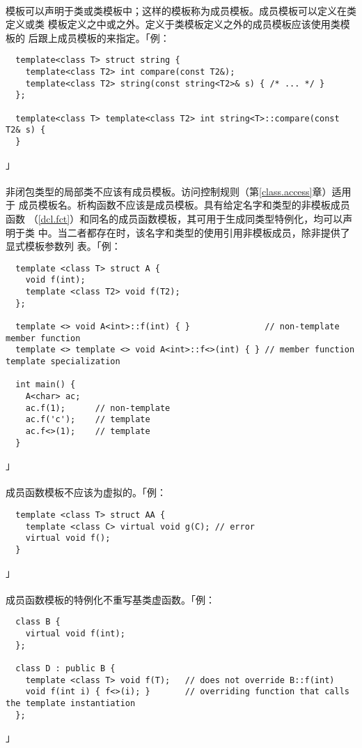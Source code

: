 \paragraph{}
模板可以声明于类或类模板中；这样的模板称为成员模板。成员模板可以定义在类定义或类
模板定义之中或之外。定义于类模板定义之外的成员模板应该使用类模板的
后跟上成员模板的来指定。「例：
\begin{lstlisting}
  template<class T> struct string {
    template<class T2> int compare(const T2&);
    template<class T2> string(const string<T2>& s) { /* ... */ }
  };

  template<class T> template<class T2> int string<T>::compare(const T2& s) {
  }
\end{lstlisting}」

\paragraph{}
非闭包类型的局部类不应该有成员模板。访问控制规则（第\ref{class.access}章）适用于
成员模板名。析构函数不应该是成员模板。具有给定名字和类型的非模板成员函数
（\ref{dcl.fct}）和同名的成员函数模板，其可用于生成同类型特例化，均可以声明于类
中。当二者都存在时，该名字和类型的使用引用非模板成员，除非提供了显式模板参数列
表。「例：
\begin{lstlisting}
  template <class T> struct A {
    void f(int);
    template <class T2> void f(T2);
  };

  template <> void A<int>::f(int) { }               // non-template member function
  template <> template <> void A<int>::f<>(int) { } // member function template specialization

  int main() {
    A<char> ac;
    ac.f(1);      // non-template
    ac.f('c');    // template
    ac.f<>(1);    // template
  }
\end{lstlisting}」

\paragraph{}
成员函数模板不应该为虚拟的。「例：
\begin{lstlisting}
  template <class T> struct AA {
    template <class C> virtual void g(C); // error
    virtual void f();
  }
\end{lstlisting}」

\paragraph{}
成员函数模板的特例化不重写基类虚函数。「例：
\begin{lstlisting}
  class B {
    virtual void f(int);
  };

  class D : public B {
    template <class T> void f(T);   // does not override B::f(int)
    void f(int i) { f<>(i); }       // overriding function that calls the template instantiation
  };
\end{lstlisting}」

